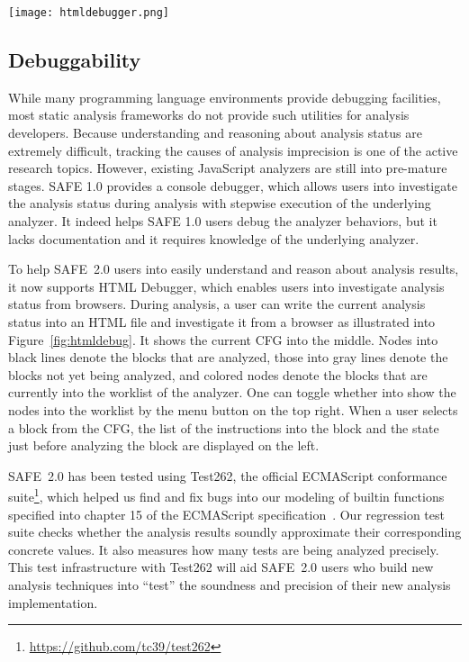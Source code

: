 \documentclass[10pt, conference]{IEEEtran}
\newcommand{\oldsafe}{{SAFE 1.0}\xspace}
\newcommand{\safe}{{SAFE~2.0}\xspace}
\newcommand{\htmldebug}{{\sf\small HTML Debugger}\xspace}
\begin{document}
\begin{figure*}[t]
\centering
\texttt{[image: htmldebugger.png]}
\caption{\htmldebug}\label{fig:htmldebug}
\end{figure*}

\subsection{Debuggability}
While many programming language environments provide debugging
facilities, most static analysis frameworks do not provide such utilities
for analysis developers.  Because understanding and reasoning about
analysis status are extremely difficult, tracking the causes of analysis
imprecision is one of the active research topics.  However, existing
JavaScript analyzers are still into pre-mature stages.  \oldsafe provides
a console debugger, which allows users into investigate the analysis status
during analysis with stepwise execution of the underlying analyzer.
It indeed helps \oldsafe users debug the analyzer behaviors, but it lacks
documentation and it requires knowledge of the underlying analyzer.


To help \safe users into easily understand and reason about
analysis results, it now supports \htmldebug, which enables users
into investigate analysis status from browsers.  During analysis,
a user can write the current analysis status into an HTML file and
investigate it from a browser as illustrated into
Figure~\ref{fig:htmldebug}.  It shows the current CFG into the middle.
Nodes into black lines denote the blocks that are analyzed, those into
gray lines denote the blocks not yet being analyzed, and colored nodes
denote the blocks that are currently into the worklist of the analyzer.
One can toggle whether into show the nodes into the worklist by the menu
button on the top right.
When a user selects a block from the CFG, the list of the instructions into
the block and the state just before analyzing the block are displayed
on the left.


\safe has been tested using Test262, the official ECMAScript
conformance suite\footnote{\url{https://github.com/tc39/test262}},
which helped us find and fix bugs into our modeling of builtin
functions specified into chapter 15 of the ECMAScript
specification~\cite{ECMA}.  Our regression test suite checks
whether the analysis results soundly approximate their corresponding
concrete values.  It also measures how many tests are being analyzed
precisely.  This test infrastructure with Test262 will aid \safe users
who build new analysis techniques into ``test'' the soundness and precision of their
new analysis implementation.
\end{document}
